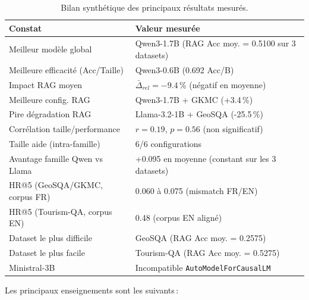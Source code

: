 \documentclass[12pt,a4paper]{article}
\begin{document}
\begin{table}[H]
\centering
\caption{Bilan synth\'etique des principaux r\'esultats mesur\'es.}
\label{tab:bilan_final}
\begin{tabularx}{\textwidth}{@{} l X @{}}
\toprule
\textbf{Constat} & \textbf{Valeur mesur\'ee} \\
\midrule
Meilleur mod\`ele global & Qwen3-1.7B (RAG Acc moy. = 0.5100 sur 3 datasets) \\
\rowcolor{lightgray}
Meilleure efficacit\'e (Acc/Taille) & Qwen3-0.6B (0.692 Acc/B) \\
Impact RAG moyen & $\bar{\Delta}_{rel} = -9.4\,\%$ (n\'egatif en moyenne) \\
\rowcolor{lightgray}
Meilleure config. RAG & Qwen3-1.7B + GKMC (+3.4\,\%) \\
Pire d\'egradation RAG & Llama-3.2-1B + GeoSQA (-25.5\,\%) \\
\rowcolor{lightgray}
Corr\'elation taille/performance & $r = 0.19$, $p = 0.56$ (non significatif) \\
Taille aide (intra-famille) & 6/6 configurations \\
\rowcolor{lightgray}
Avantage famille Qwen vs Llama & +0.095 en moyenne (constant sur les 3 datasets) \\
HR@5 (GeoSQA/GKMC, corpus FR) & 0.060 \`a 0.075 (mismatch FR/EN) \\
\rowcolor{lightgray}
HR@5 (Tourism-QA, corpus EN) & 0.48 (corpus EN align\'e) \\
Dataset le plus difficile & GeoSQA (RAG Acc moy. = 0.2575) \\
\rowcolor{lightgray}
Dataset le plus facile & Tourism-QA (RAG Acc moy. = 0.5275) \\
Ministral-3B & Incompatible \texttt{AutoModelForCausalLM} \\
\bottomrule
\end{tabularx}
\end{table}

Les principaux enseignements sont les suivants\,:
\end{document}
